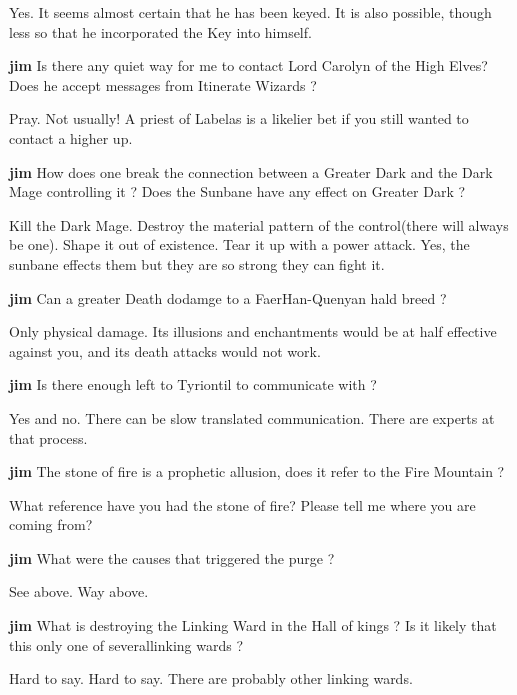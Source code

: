 Yes.  It seems almost certain that he has been keyed.  It is also 
possible,  though less so that he incorporated the Key into himself.

{\bf jim}
Is there any quiet way for me to contact Lord Carolyn of the High 
Elves? Does he  accept messages from Itinerate Wizards ?

Pray. Not usually!  A priest of Labelas is a likelier bet if you 
still wanted to contact a higher up.

{\bf jim}
How does one break the connection between a Greater Dark and the  
Dark Mage controlling it ? Does the Sunbane have any effect on 
Greater Dark ?

Kill the Dark Mage.  Destroy the material pattern of the 
control(there will always be one).  Shape it out of existence.  Tear 
it up with a power attack. 	Yes, the sunbane effects them but they 
are so strong they can fight it. 

{\bf jim}
Can a greater Death dodamge  to a FaerHan-Quenyan hald breed ?

Only physical damage. Its illusions and enchantments would be at 
half effective against you, and its death attacks would not work.  

{\bf jim}
Is there enough left to Tyriontil to communicate with ? 

Yes and no.  There can be slow translated communication.  There are 
experts  at that process.

{\bf jim}
The stone of fire is a prophetic allusion, does it refer to the 
Fire Mountain ?

What reference have you had the stone of fire?  Please tell me where 
you are coming from?

{\bf jim}
What were the causes that triggered the purge ?

See above.  Way above.

{\bf jim}
What is destroying the Linking Ward in the Hall of kings ? Is it 
likely that this only one of severallinking wards ? 

Hard to say.  Hard to say.  There are probably other linking wards.



